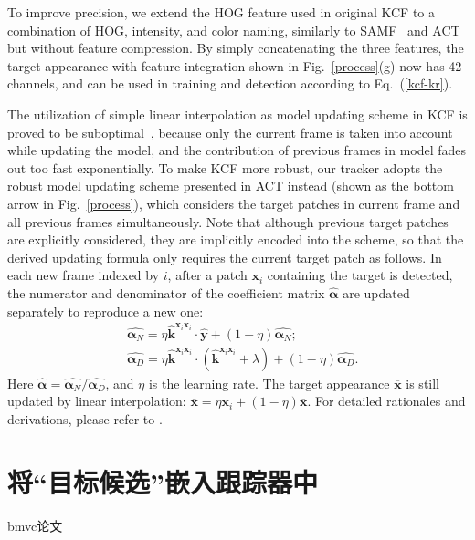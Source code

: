 To improve precision, we extend the HOG feature used in original KCF to a combination of HOG, intensity, and color naming,
similarly to SAMF~\citep{samf} and ACT~\citep{act} but without feature compression.
By simply concatenating the three features, the target appearance with feature integration shown in Fig.~\ref{process}(g) now has 42 channels, and can be used in training and detection
according to Eq.~(\ref{kcf-kr}).

The utilization of simple linear interpolation as model updating scheme in KCF is proved to be suboptimal~\citep{act},
because only the current frame is taken into account while updating the model, and the contribution of previous frames in model
fades out too fast exponentially.
To make KCF more robust, our tracker adopts the robust model updating scheme presented in ACT instead (shown as the bottom arrow in Fig.~\ref{process}),
which considers the target patches in current frame and all previous frames simultaneously. 
Note that although previous target patches are explicitly considered, they are implicitly encoded into the scheme, so that
the derived updating formula only requires the current target patch as follows.
In each new frame indexed by $i$, after a patch $\mathbf{x}_i$ containing the target is detected, %
the numerator and denominator of 
the coefficient matrix $\hat{\boldsymbol{\alpha}}$ are updated
separately to reproduce a new one:
\begin{equation}
\begin{aligned}
	&\hat{\boldsymbol{\alpha}_N}=\eta\hat{\mathbf{k}}^{\mathbf{x}_i \mathbf{x}_i} \cdot \hat{\mathbf{y}} + (1-\eta){\hat{\boldsymbol{\alpha}_N}};
	\\
	&\hat{\boldsymbol{\alpha}_D}=\eta\hat{\mathbf{k}}^{\mathbf{x}_i \mathbf{x}_i} \cdot (\hat{\mathbf{k}}^{\mathbf{x}_i \mathbf{x}_i} +
	\lambda) + (1-\eta){\hat{\boldsymbol{\alpha}_D}}.\label{kcfdp-updating}
\end{aligned}
\end{equation}
Here $\hat{\boldsymbol{\alpha}}={{\hat{\boldsymbol{\alpha}_N}}}/{{\hat{\boldsymbol{\alpha}_D}}}$, and $\eta$ is the learning rate.
The target appearance $\overline{\mathbf{x}}$ is still updated by linear interpolation: $\overline{\mathbf{x}}=\eta\mathbf{x}_i+(1-\eta)\overline{\mathbf{x}}$.
For detailed rationales and derivations, please refer to \cite{act}.


\section{将``目标候选''嵌入跟踪器中}
bmvc论文

